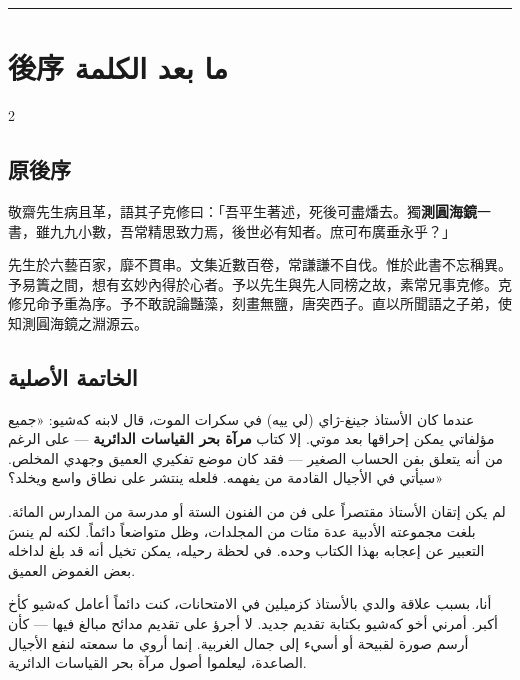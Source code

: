 \documentclass[11pt,a4paper]{article}
\newcommand{\ar}[1]{\arabicfont\beginR #1\endR}
\newcommand{\longline}{\noindent\rule{\textwidth}{0.4pt}}
\newcommand{\arnote}[1]{\textcolor{arabicblue}{\ar{#1}}}
\begin{document}
\vspace{0.5cm}
\begin{center}
\longline
\end{center}

\newpage

\section*{後序 \hfill \ar{ما بعد الكلمة}}
\label{sec:afterword}

\begin{paracol}{2}

\begin{leftcolumn*}
\subsection*{原後序}

敬齋先生病且革，語其子克修曰：「吾平生著述，死後可盡燔去。獨\textbf{測圓海鏡}一書，雖九九小數，吾常精思致力焉，後世必有知者。庶可布廣垂永乎？」

先生於六藝百家，靡不貫串。文集近數百卷，常謙謙不自伐。惟於此書不忘稱異。予易簀之間，想有玄妙內得於心者。予以先生與先人同榜之故，素常兄事克修。克修兄命予重為序。予不敢說論豔藻，刻畫無鹽，唐突西子。直以所聞語之子弟，使知測圓海鏡之淵源云。
\end{leftcolumn*}

\begin{rightcolumn}
\subsection*{\ar{الخاتمة الأصلية}}

\arnote{عندما كان الأستاذ جينغ-ژاي (لي ييه) في سكرات الموت، قال لابنه كەشيو: «جميع مؤلفاتي يمكن إحراقها بعد موتي. إلا كتاب \textbf{مرآة بحر القياسات الدائرية} — على الرغم من أنه يتعلق بفن الحساب الصغير — فقد كان موضع تفكيري العميق وجهدي المخلص. سيأتي في الأجيال القادمة من يفهمه. فلعله ينتشر على نطاق واسع ويخلد؟»}

\arnote{لم يكن إتقان الأستاذ مقتصراً على فن من الفنون الستة أو مدرسة من المدارس المائة. بلغت مجموعته الأدبية عدة مئات من المجلدات، وظل متواضعاً دائماً. لكنه لم ينسَ التعبير عن إعجابه بهذا الكتاب وحده. في لحظة رحيله، يمكن تخيل أنه قد بلغ لداخله بعض الغموض العميق.}

\arnote{أنا، بسبب علاقة والدي بالأستاذ كزميلين في الامتحانات، كنت دائماً أعامل كەشيو كأخ أكبر. أمرني أخو كەشيو بكتابة تقديم جديد. لا أجرؤ على تقديم مدائح مبالغ فيها — كأن أرسم صورة لقبيحة أو أسيء إلى جمال الغربية. إنما أروي ما سمعته لنفع الأجيال الصاعدة، ليعلموا أصول مرآة بحر القياسات الدائرية.}
\end{rightcolumn}

\end{paracol}
\end{document}
